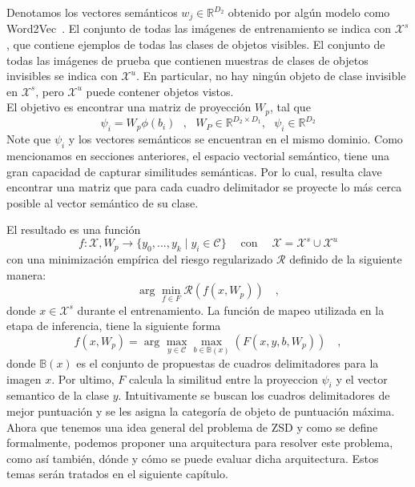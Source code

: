 Denotamos los vectores semánticos $w_j \in \mathbb{R}^{D_2}$ obtenido por algún modelo como Word2Vec~\cite{mikolov2013distributed}. El conjunto de todas las imágenes de entrenamiento se indica con $\mathcal{X}^s$, que contiene ejemplos de todas las clases de objetos visibles.  El conjunto de todas las imágenes de prueba que contienen muestras de clases de objetos invisibles se indica con  $\mathcal{X}^u$. En particular, no hay ningún objeto de clase invisible en $\mathcal{X}^s$, pero $\mathcal{X}^u$ puede contener objetos vistos.\\

El objetivo es encontrar una matriz de proyección $W_p$, tal que 
\[ \psi_i = W_p\phi(b_i) \:\:\:,\:\:\: W_P \in \mathbb{R}^{D_2 \times D_1},\:\:\: \psi_i \in \mathbb{R}^{D_2} \] 
Note que $\psi_i$ y los vectores semánticos se encuentran en el mismo dominio. Como mencionamos en secciones anteriores, el espacio vectorial semántico, tiene una gran capacidad de capturar similitudes semánticas. Por lo cual, resulta clave encontrar una matriz que para cada cuadro delimitador se proyecte lo más cerca posible al vector semántico de su clase. 

El resultado es una función 
\[f : \mathcal{X}, W_p  \to \{y_0,...,y_k\mid y_i \in \mathcal{C}\} \quad \operatorname{con}\quad \mathcal{X} =  \mathcal{X}^s \cup \mathcal{X}^u\] 
con una minimización empírica del riesgo regularizado $\mathcal{R}$ definido de la siguiente manera: 
\[ \arg_{}\min_{f \in F} \mathcal{R}(f(x,W_p))\quad, \] 
donde $x \in \mathcal{X}^s$ durante el entrenamiento. La función de mapeo utilizada en la etapa de inferencia, tiene la siguiente forma \[ f(x,W_p) = \arg_{}\max_{y \in \mathcal{C}}\max_{b \in \mathbb{B}(x)} (F(x,y,b,W_p)) \quad,\] donde $\mathbb{B}(x)$ es el conjunto de propuestas de cuadros delimitadores para la imagen $x$. Por ultimo, $F$ calcula la similitud entre la proyeccion $\psi_i$ y el vector semantico de la clase $y$. Intuitivamente se buscan los cuadros delimitadores de mejor puntuación y se les asigna la categoría de objeto de puntuación máxima.\\

Ahora que tenemos una idea general del problema de ZSD y como se define formalmente, podemos proponer una arquitectura para resolver este problema, como así también, dónde y cómo se puede evaluar dicha arquitectura. Estos temas serán tratados en el siguiente capítulo.